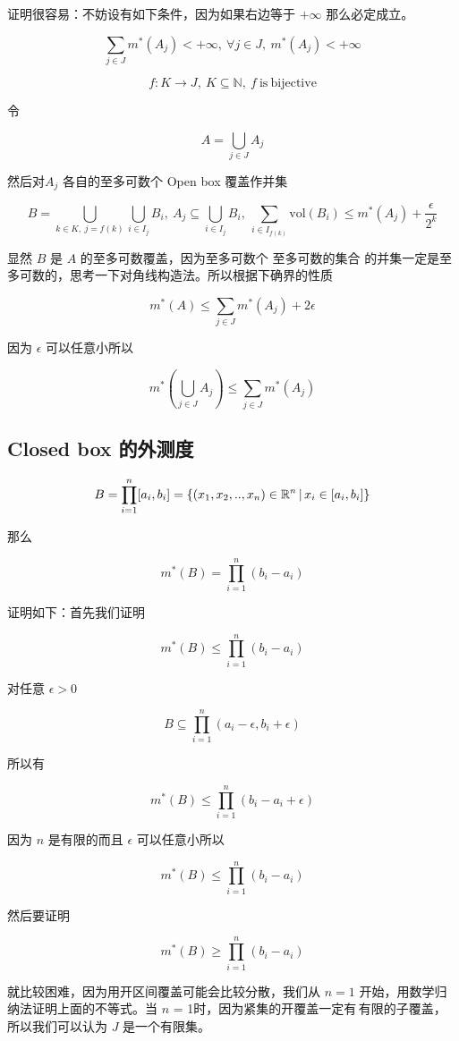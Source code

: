 证明很容易：不妨设有如下条件，因为如果右边等于 $+\infty$ 那么必定成立。

\[
\sum_{j \in J}m^*(A_j) < +\infty ,\: \forall j \in J,\: m^*(A_j) < +\infty
\]

\[
f: K \to J,\: K \subseteq \mathbb{N} ,\: f\mathrm{\: is \: bijective}
\]

令

\[
A = \bigcup_{j \in J}A_j
\]

然后对$A_j$ 各自的至多可数个 Open box 覆盖作并集

\[
B = \bigcup_{k \in K ,\: j = f(k)}\bigcup_{i \in I_j} B_i, \: A_{j} \subseteq \bigcup_{i \in I_j} B_i, \: \sum_{i \in I_{f(k)}} \mathrm{vol}(B_i) \le m^*(A_j) + \frac{\epsilon}{2^k}
\]

显然 $B$ 是 $A$ 的至多可数覆盖，因为至多可数个 \: 至多可数的集合 \: 的并集一定是至多可数的，思考一下对角线构造法。所以根据下确界的性质

\[
m^*(A) \le \sum_{j \in J}m^*(A_j) + 2\epsilon
\]

因为 $\epsilon$ 可以任意小所以

\[
m^*(\bigcup_{j \in J}A_j) \le \sum_{j \in J}m^*(A_j)
\]

\subsection{Closed box 的外测度}

\[
B = \prod_{i=1}^{n}[a_i, b_i] = \{ (x_1, x_2, .., x_n) \in \mathbb{R}^n \,\vert\, x_i \in [a_i, b_i] \}
\]

那么

\[
m^*(B) = \prod_{i=1}^{n}(b_i - a_i)
\]

证明如下：首先我们证明

\[
m^*(B) \le \prod_{i=1}^{n}(b_i - a_i)
\]

对任意 $\epsilon > 0$ 

\[
B \subseteq \prod_{i=1}^{n}(a_i - \epsilon, b_i + \epsilon)
\]

所以有

\[
m^*(B) \le \prod_{i=1}^{n}(b_i - a_i + \epsilon)
\]

因为 $n$ 是有限的而且 $\epsilon$ 可以任意小所以


\[
m^*(B) \le \prod_{i=1}^{n}(b_i - a_i)
\]

然后要证明


\[
m^*(B) \ge \prod_{i=1}^{n}(b_i - a_i)
\]

就比较困难，因为用开区间覆盖可能会比较分散，我们从 $n = 1$ 开始，用数学归纳法证明上面的不等式。当 $n$ = 1时，因为紧集的开覆盖一定有\,有限的子覆盖，所以我们可以认为 $J$ 是一个有限集。

